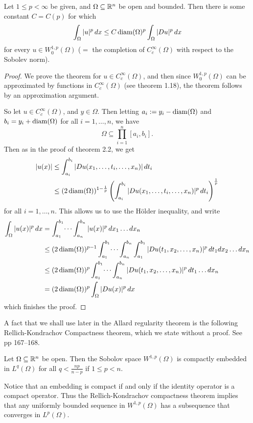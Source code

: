 \begin{theorem}\label{thm: poincare inequality}
Let $1 \le p < \infty$ be given, and $\Omega \subseteq \mathbb{R}^n$ be open and bounded. Then there is some constant $C=C(p)$ for which
\[
    \int_{\Omega} |u|^p \, dx \le C \operatorname{diam}(\Omega)^p \int_{\Omega} |Du|^p\, dx
\]
for every $u \in W_0^{1,p}(\Omega)$ ($=$ the completion of $C_c^{\infty}(\Omega)$ with respect to the Sobolev norm).
\end{theorem}
\begin{proof}
We prove the theorem for $u \in C_c^{\infty}(\Omega)$, and then since $W_0^{1,p}(\Omega)$ can be approximated by functions in $C_c^{\infty}(\Omega)$ (see \cite{kinnunen20} theorem 1.18), the theorem follows by an approximation argument.

So let $u \in C_c^{\infty}(\Omega)$, and $y \in \Omega$. Then letting $a_i := y_i - \operatorname{diam}(\Omega)$ and $b_i = y_i + \operatorname{diam}(\Omega)$ for all $i=1, \dots, n$, we have
\[
    \Omega \subseteq \prod_{i=1}^n [a_i, b_i].
\]
Then as in the proof of \cite{kinnunen20} theorem 2.2, we get
\begin{align*}
    |u(x)| &\le \int_{a_i}^{b_i} |Du(x_1, \dots, t_i, \dots, x_n)| \, dt_i \\
    &\le (2 \operatorname{diam}(\Omega))^{1-\frac{1}{p}} \left( \int_{a_i}^{b_i} |Du(x_1, \dots, t_i, \dots, x_n)|^p \, dt_i \right)^{\frac{1}{p}}
\end{align*}
for all $i = 1, \dots, n$. This allows us to use the Hölder inequality, and write
\begin{align*}
    \int_{\Omega} |u(x)|^p \, dx &= \int_{a_1}^{b_1} \dots \int_{a_n}^{b_n} |u(x)|^p \, dx_1\dots dx_n \\
    &\le (2\operatorname{diam}(\Omega))^{p-1} \int_{a_1}^{b_1} \dots \int_{a_n}^{b_n} \int_{a_1}^{b_1} |Du(t_1, x_2, \dots, x_n)|^p \, dt_1 dx_2\dots dx_n \\
    &\le (2\operatorname{diam}(\Omega))^{p} \int_{a_1}^{b_1} \dots \int_{a_n}^{b_n} |Du(t_1, x_2, \dots, x_n)|^p \, dt_1\dots dx_n \\
    &= (2\operatorname{diam}(\Omega))^{p} \int_{\Omega} |Du(x)|^p \, dx
\end{align*}
which finishes the proof.
\end{proof}

A fact that we shall use later in the Allard regularity theorem is the following Rellich-Kondrachov Compactness theorem, which we state without a proof. See \cite{gt01} pp 167--168.
\begin{theorem}\label{thm: Rellich-Kondrachov}
Let $\Omega\subseteq \mathbb{R}^n$ be open. Then the Sobolov space $W^{1,p}(\Omega)$ is compactly embedded in $L^q(\Omega)$ for all $q < \frac{np}{n-p}$ if $1\le p < n$.
\end{theorem}

Notice that an embedding is compact if and only if the identity operator is a compact operator. Thus the Rellich-Kondrachov compactness theorem implies that any uniformly bounded sequence in $W^{1,p}(\Omega)$ has a subsequence that converges in $L^p(\Omega)$.